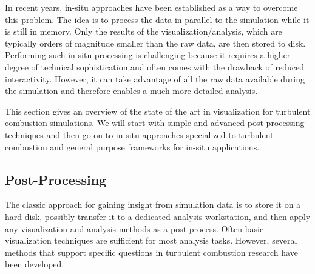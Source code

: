 %
In recent years, in-situ approaches have been established as a way to overcome
this problem.
%
The idea is to process the data in parallel to the simulation while it is still
in memory.
%
Only the results of the visualization/analysis, which are typically orders of
magnitude smaller than the raw data, are then stored to disk.
%
Performing such in-situ processing is challenging because it requires a higher
degree of technical sophistication and often comes with the drawback of reduced
interactivity.
%
However, it can take advantage of all the raw data available during the
simulation and therefore enables a much more detailed analysis.
%

%
This section gives an overview of the state of the art in visualization for
turbulent combustion simulations.
%
We will start with simple and advanced post-processing techniques and then go on
to in-situ approaches specialized to turbulent combustion and general purpose
frameworks for in-situ applications.
%
%
\subsection{Post-Processing} %
\label{sub:post_processing}
%
The classic approach for gaining insight from simulation data is to store it on
a hard disk, possibly transfer it to a dedicated analysis workstation, and then
apply any visualization and analysis methods as a post-process.
%
Often basic visualization techniques are sufficient for most analysis tasks.
%
However, several methods that support specific questions in turbulent combustion
research have been developed.
%
